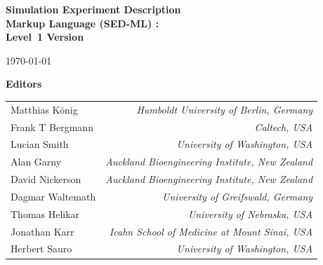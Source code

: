 
\begin{titlepage}


\begin{center}

  \textbf{\sffamily\bfseries\huge
    Simulation Experiment Description\\ Markup Language (SED-ML) :\\[0.3em]
    Level~1 Version~}

\vspace*{0.5in}

\large
\today\\[0.25in]


\vspace{0.5in}

\textbf{\sffamily Editors}\\[7pt]
\begin{tabular}{l>{\hspace*{15pt}}r}
Matthias K\"{o}nig & \emph{Humboldt University of Berlin, Germany}\\
Frank T Bergmann & \emph{Caltech, USA}\\
Lucian Smith & \emph{University of Washington, USA}\\
Alan Garny & \emph{Auckland Bioengineering Institute, New Zealand}\\
David Nickerson & \emph{Auckland Bioengineering Institute, New Zealand}\\
Dagmar Waltemath & \emph{University of Greifswald, Germany}\\
Thomas Helikar & \emph{University of Nebraska, USA}\\
Jonathan Karr & \emph{Icahn School of Medicine at Mount Sinai, USA}\\
Herbert Sauro & \emph{University of Washington, USA}
\end{tabular}
 
\vspace{1.2in}


\end{center}
\end{titlepage}
